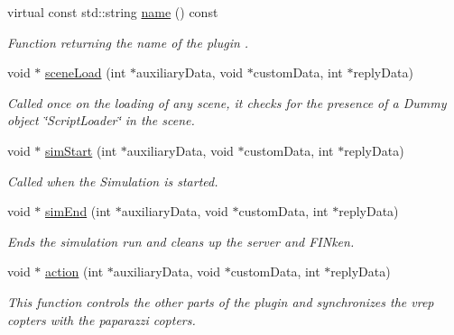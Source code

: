 \begin{DoxyCompactItemize}
virtual const std\+::string \hyperlink{classFinkenPlugin_a1a7d0d65f88654c37b282e07d36417ec}{name} () const 
\begin{DoxyCompactList}\small\item\em Function returning the name of the plugin . \end{DoxyCompactList}\item 
void $\ast$ \hyperlink{classFinkenPlugin_a82c0cd5fa1b9fdb5f5a625458a9b545b}{scene\+Load} (int $\ast$auxiliary\+Data, void $\ast$custom\+Data, int $\ast$reply\+Data)
\begin{DoxyCompactList}\small\item\em Called once on the loading of any scene, it checks for the presence of a Dummy object \char`\"{}\+Script\+Loader\char`\"{} in the scene. \end{DoxyCompactList}\item 
void $\ast$ \hyperlink{classFinkenPlugin_a142f62305fcc926bb6cf86744edbb82b}{sim\+Start} (int $\ast$auxiliary\+Data, void $\ast$custom\+Data, int $\ast$reply\+Data)
\begin{DoxyCompactList}\small\item\em Called when the Simulation is started. \end{DoxyCompactList}\item 
void $\ast$ \hyperlink{classFinkenPlugin_aec5f5cf14ca485055ccc321a716780a4}{sim\+End} (int $\ast$auxiliary\+Data, void $\ast$custom\+Data, int $\ast$reply\+Data)
\begin{DoxyCompactList}\small\item\em Ends the simulation run and cleans up the server and F\+I\+Nken. \end{DoxyCompactList}\item 
void $\ast$ \hyperlink{classFinkenPlugin_a00d8bcdd7c4b28eb76712b84f512b12b}{action} (int $\ast$auxiliary\+Data, void $\ast$custom\+Data, int $\ast$reply\+Data)
\begin{DoxyCompactList}\small\item\em This function controls the other parts of the plugin and synchronizes the vrep copters with the paparazzi copters. \end{DoxyCompactList}\end{DoxyCompactItemize}
